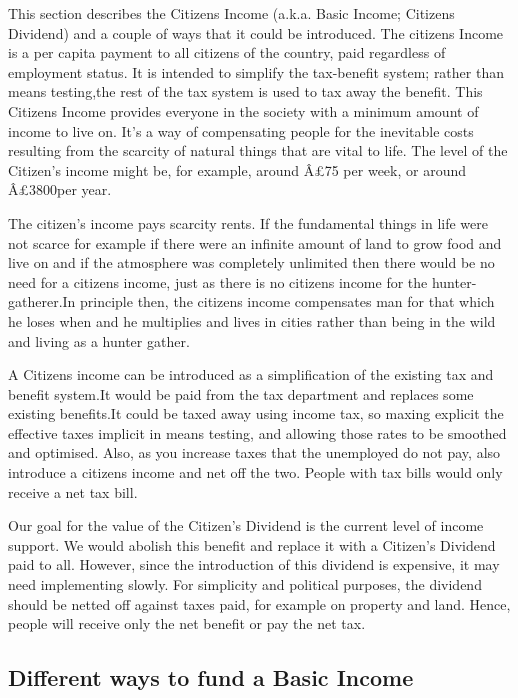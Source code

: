 \documentclass[]{tufte-handout}
\begin{document}
This section describes the Citizens Income (a.k.a. Basic Income;
Citizens Dividend) and a couple of ways that it could be introduced. The
citizens Income is a per capita payment to all citizens of the country,
paid regardless of employment status. It is intended to simplify the
tax-benefit system; rather than means testing,the rest of the tax system
is used to tax away the benefit. This Citizens Income provides everyone
in the society with a minimum amount of income to live on. It's a way of
compensating people for the inevitable costs resulting from the scarcity
of natural things that are vital to life. The level of the Citizen's
income might be, for example, around Â£75 per week, or around Â£3800per
year.

The citizen's income pays scarcity rents. If the fundamental things in
life were not scarce for example if there were an infinite amount of
land to grow food and live on and if the atmosphere was completely
unlimited then there would be no need for a citizens income, just as
there is no citizens income for the hunter-gatherer.In principle then,
the citizens income compensates man for that which he loses when and he
multiplies and lives in cities rather than being in the wild and living
as a hunter gather.

A Citizens income can be introduced as a simplification of the existing
tax and benefit system.It would be paid from the tax department and
replaces some existing benefits.It could be taxed away using income tax,
so maxing explicit the effective taxes implicit in means testing, and
allowing those rates to be smoothed and optimised. Also, as you increase
taxes that the unemployed do not pay, also introduce a citizens income
and net off the two. People with tax bills would only receive a net tax
bill.

Our goal for the value of the Citizen's Dividend is the current level of
income support. We would abolish this benefit and replace it with a
Citizen's Dividend paid to all. However, since the introduction of this
dividend is expensive, it may need implementing slowly. For simplicity
and political purposes, the dividend should be netted off against taxes
paid, for example on property and land. Hence, people will receive only
the net benefit or pay the net tax.

\hypertarget{different-ways-to-fund-a-basic-income}{%
\subsection{Different ways to fund a Basic
Income}\label{different-ways-to-fund-a-basic-income}}
\end{document}
